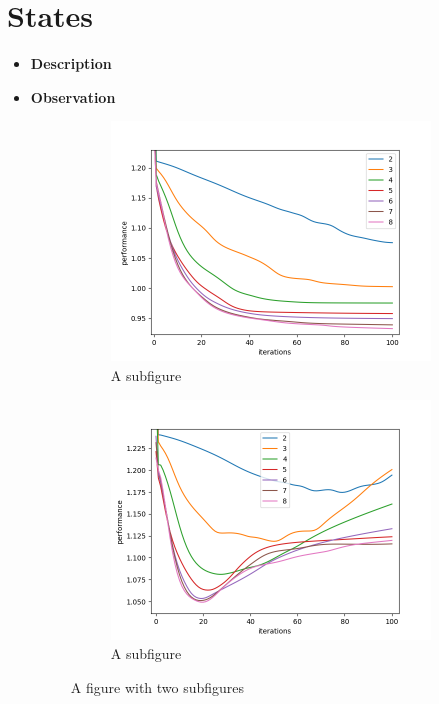 \documentclass[thesis=M,english]{FITthesis}[2012/10/20]
\begin{document}
\section{States}

\begin{itemize}
\item \textbf{ Description }
\item \textbf{ Observation }

\begin{figure}
\centering
\begin{subfigure}{.8\textwidth}
  \centering
  \includegraphics[width=1\linewidth]{img/ex5/train_small.png}
  \caption{A subfigure}
  \label{fig:sub1}
\end{subfigure}
\begin{subfigure}{.8\textwidth}
  \centering
  \includegraphics[width=1\linewidth]{img/ex5/test_small.png}
  \caption{A subfigure}
  \label{fig:sub2}
\end{subfigure}
\caption{A figure with two subfigures}
\label{fig:test}
\end{figure}


\end{itemize}
\end{document}
